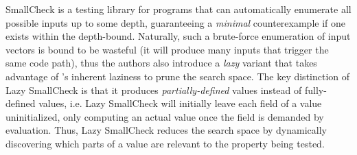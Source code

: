 SmallCheck \cite{runciman_smallcheck_2008} is a testing library for
\haskell programs
that can automatically
enumerate all possible inputs up to some depth, guaranteeing a
\emph{minimal} counterexample if one exists within the depth-bound.
%
Naturally, such a brute-force enumeration of input vectors is bound to
be wasteful (\ie it will produce many inputs that trigger the same code
path), thus the authors also introduce a \emph{lazy} variant that takes
advantage of \haskell's inherent laziness to prune the search space.
%
The key distinction of Lazy SmallCheck is that it produces
\emph{partially-defined} values instead of fully-defined values,
i.e. Lazy SmallCheck will initially leave each field of a value
uninitialized,
%
only computing an actual value once the field is demanded by
evaluation.
Thus, Lazy SmallCheck reduces the search space by
dynamically discovering which parts of a value are relevant to the
property being tested.
%
%

